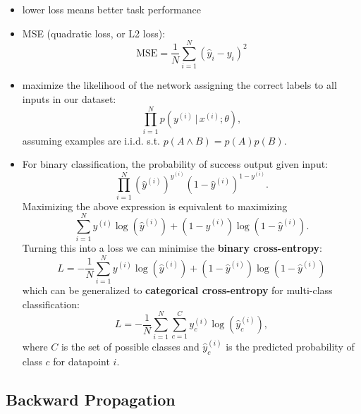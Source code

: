 \documentclass[twocolumn,landscape,10pt]{article}
\theoremstyle{definition}
\begin{document}
\begin{itemize}
    \item lower loss means better task performance
    \item MSE (quadratic loss, or L2 loss):
        \[
            \text{MSE}=\frac{1}{N}\sum_{i=1}^{N} {\left(\hat{y}_i-y_i\right)}^{2}
        \]
    \item maximize the likelihood of the network assigning the correct labels to
        all inputs in our dataset:
        \[
            \prod_{i=1}^{N} p\left(y^{(i)}\,|\,x^{(i)};\theta\right),
        \]
        assuming examples are i.i.d. s.t. $p(A\wedge B)=p(A)p(B)$.
    \item For binary classification, the probability of success output given
        input:
        \[
            \prod_{i=1}^{N} {\left(\hat{y}^{(i)}\right)}^{y^{(i)}}
            {\left(1-\hat{y}^{(i)}\right)}^{1-y^{(i)}}.
        \]
        Maximizing the above expression is equivalent to maximizing
        \[
            \sum_{i=1}^{N}
            y^{(i)}\log\left(\hat{y}^{(i)}\right)+(1-\hat{y}^{(i)})\log\left(1-\hat{y}^{(i)}\right).
        \]
        Turning this into a loss we can minimise the \textbf{binary
        cross-entropy}:
        \[
            L=-\frac{1}{N}\sum_{i=1}^{N} 
            y^{(i)}\log\left(\hat{y}^{(i)}\right)+(1-\hat{y}^{(i)})\log\left(1-\hat{y}^{(i)}\right)
        \]
        which can be generalized to \textbf{categorical cross-entropy} for
        multi-class classification:
        \[
            L=-\frac{1}{N}\sum_{i=1}^{N} \sum_{c=1}^{C}
            y_c^{(i)}\log\left(\hat{y}_c^{(i)}\right),
        \]
        where $C$ is the set of possible classes and $\hat{y}_c^{(i)}$ is the
        predicted probability of class $c$ for datapoint $i$.
\end{itemize} 

\subsection{Backward Propagation}
\end{document}
